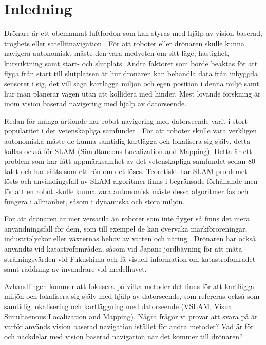 
\chapter{Inledning}

Drönare är ett obemannat luftfordon som kan styras med hjälp av vision baserad, tröghets eller satellitnavigation \citep{geospatial}. För att roboter eller drönaren skulle kunna navigera autonomiskt måste den vara medveten om sitt läge, hastighet, kursriktning samt start- och slutplats. Andra faktorer som borde beaktas för att flyga från start till slutplatsen är hur drönaren kan behandla data från inbyggda sensorer i sig, det vill säga kartlägga miljön och egen position i denna miljö samt hur man planerar vägen utan att kollidera med hinder. Mest lovande forskning är inom vision baserad navigering med hjälp av datorseende.

Redan för många årtionde har robot navigering med datorseende varit i stort popularitet i det vetenskapliga samfundet \citep{982903}. För att roboter skulle vara verkligen autonomiska måste de kunna samtidig kartlägga och lokalisera sig själv, detta kallas också för SLAM (Simultaneous Localization and Mapping)\citep{realslamproblem}. Detta är ett problem som har fått uppmärksamhet av det vetenskapliga samfundet sedan 80-talet och har sätts som ett rön om det löses. Teoretiskt har SLAM problemet lösts och användingsfall av SLAM algoritmer finns i begränsade förhållande men för att en robot skulle kunna vara autonomisk måste dessa algoritmer fås och fungera i allmänhet, såsom i dynamiska och stora miljön.

För att drönaren är mer versatila än roboter som inte flyger så finns det mera användningsfall för dem, som till exempel de kan övervaka markföroreningar, industriolyckor eller växternas behov av vatten och näring \citep{crowdsurveillance}. Drönaren har också användts vid katastrofområden, såsom vid Japans jordbävning för att mäta strålningsvärden vid Fukushima och få visuell information om katastrofområdet samt räddning av invandrare vid medelhavet.

Avhandlingen kommer att fokusera på vilka metoder det finns för att kartlägga miljön och lokalisera sig själv med hjälp av datorseende, som refereras också som samtidig lokalisering och kartläggning med datorseende (VSLAM, Visual Simultaenous Localization and Mapping). Några frågor vi provar att svara på är varför används vision baserad navigation istället för andra metoder? Vad är för och nackdelar med vision baserad navigation när det kommer till drönaren?

